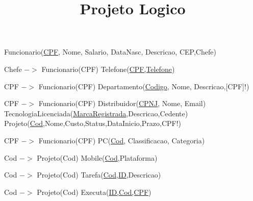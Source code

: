 \documentclass{article}
\title{Projeto Logico}
\begin{document}
\maketitle
\noindent Funcionario(\underline{CPF}, Nome, Salario, DataNasc, Descricao, CEP,Chefe)

\hspace{2cm}Chefe $->$ Funcionario(CPF)
\newline\newline
Telefone(\underline{CPF,Telefone})

\hspace{2cm} CPF $->$ Funcionario(CPF)
\newline\newline
Departamento(\underline{Codigo}, Nome, Descricao,[CPF]!)

\hspace{2cm}CPF $->$ Funcionario(CPF)
\newline\newline
Distribuidor(\underline{CPNJ}, Nome, Email)
\newline\newline
TecnologiaLicenciada(\underline{MarcaRegistrada},Descricao,Cedente)
\newline\newline
Projeto(\underline{Cod},Nome,Custo,Status,DataInicio,Prazo,CPF!)

\hspace{2cm}CPF $->$ Funcionario(CPF)
\newline\newline
PC(\underline{Cod}, Classificacao, Categoria)


\hspace{2cm}Cod $->$ Projeto(Cod)
\newline\newline
Mobile(\underline{Cod},Plataforma)


\hspace{2cm}Cod $->$ Projeto(Cod)
\newline\newline
Tarefa(\underline{Cod,ID},Descricao)


\hspace{2cm}Cod $->$ Projeto(Cod)
\newline\newline
Executa(\underline{ID,Cod,CPF})
\end{document}
